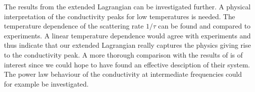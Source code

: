 \documentclass[12pt]{report}
\begin{document}
The results from the extended Lagrangian can be investigated further. A physical interpretation of the conductivity peaks for low temperatures is needed. The temperature dependence of the scattering rate $1/\tau$ can be found and compared to experiments. A linear temperature dependence would agree with experiments and thus indicate that our extended Lagrangian really captures the physics giving rise to the conductivity peak. A more thorough comparison with the results of \cite{horowitz} is of interest since we could hope to have found an effective desciption of their system. The power law behaviour of the conductivity at intermediate frequencies could for example be investigated.
\end{document}
